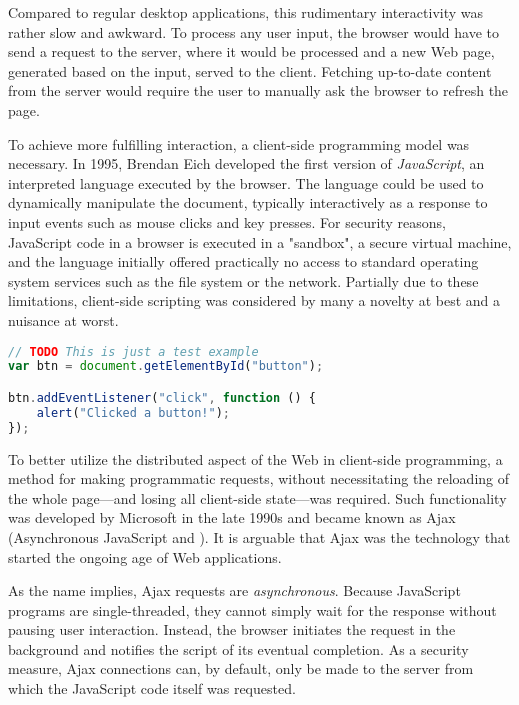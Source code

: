 Compared to regular desktop applications, this rudimentary interactivity was rather slow and awkward. To process any user input, the browser would have to send a  request to the server, where it would be processed and a new Web page, generated based on the input, served to the client. Fetching up-to-date content from the server would require the user to manually ask the browser to refresh the page.

To achieve more fulfilling interaction, a client-side programming model was necessary. In \num{1995}, Brendan Eich developed the first version of \emph{JavaScript}, an interpreted language executed by the browser. The language could be used to dynamically manipulate the document, typically interactively as a response to input events such as mouse clicks and key presses. For security reasons, JavaScript code in a browser is executed in a "sandbox", a secure virtual machine, and the language initially offered practically no access to standard operating system services such as the file system or the network. Partially due to these limitations, client-side scripting was considered by many a novelty at best and a nuisance at worst.

\begin{code}
\label{listing:js}
\begin{lstlisting}[language=JavaScript,caption=A small JavaScript program]
// TODO This is just a test example
var btn = document.getElementById("button");

btn.addEventListener("click", function () {
    alert("Clicked a button!");
});
\end{lstlisting}
\end{code}

To better utilize the distributed aspect of the Web in client-side programming, a method for making programmatic  requests, without necessitating the reloading of the whole page---and losing all client-side state---was required. Such functionality was developed by Microsoft in the late \num{1990s} and became known as Ajax (Asynchronous JavaScript and ). It is arguable that Ajax was the technology that started the ongoing age of Web applications.

As the name implies, Ajax requests are \emph{asynchronous}. Because JavaScript programs are single-threaded, they cannot simply wait for the response without pausing user interaction. Instead, the browser initiates the request in the background and notifies the script of its eventual completion. As a security measure, Ajax connections can, by default, only be made to the server from which the JavaScript code itself was requested.


